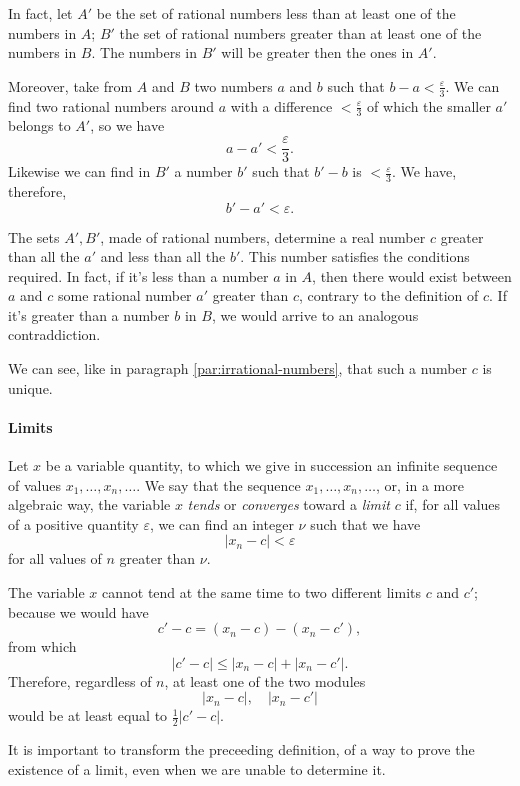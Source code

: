 \documentclass[10pt,letterpaper]{book}
\renewcommand\epsilon{\varepsilon}
\theoremstyle{definition}
\begin{document}
In fact, let $A'$ be the set of rational numbers
less than at least one of the numbers in $A$; $B'$ the set of rational numbers greater than at least one of the numbers in $B$. The numbers in $B'$ will be greater then the ones in $A'$.

Moreover, take from $A$ and $B$ two numbers $a$ and $b$ such that $b-a<\frac \epsilon 3$. We can find two rational numbers around $a$ with a difference $<\frac \epsilon 3$ of which the smaller $a'$ belongs to $A'$, so we have
\[
  a - a' < \frac \epsilon 3.
\]
Likewise we can find in $B'$ a number $b'$ such that $b'-b$ is $<\frac\epsilon 3$. We have, therefore,
\[
  b' - a' < \epsilon.
\]

The sets $A',B'$, made of rational numbers, determine a real number $c$ greater than all the $a'$ and less than all the $b'$. This number satisfies the conditions required. In fact, if it's less than a number $a$ in $A$, then there would exist between $a$ and $c$ some rational number $a'$ greater than $c$, contrary to the definition of $c$. If it's greater than a number $b$ in $B$, we would arrive to an analogous contraddiction.

We can see, like in paragraph \ref{par:irrational-numbers}, that such a number $c$ is unique.

\paragraph{Limits} Let $x$ be a variable quantity, to which we give in succession an infinite sequence of values $x_1,\dots,x_n,\dots$. We say that the sequence $x_1,\dots,x_n,\dots$, or, in a more algebraic way, the variable $x$ \textit{tends} or \textit{converges} toward a \textit{limit} $c$ if, for all values of a positive quantity $\epsilon$, we can find an integer $\nu$ such that we have
\[
  |x_n-c| < \epsilon
\]
for all values of $n$ greater than $\nu$.


The variable $x$ cannot tend at the same time to two different limits $c$ and $c'$; because we would have
\[
  c'-c = (x_n-c)-(x_n-c'),
\]
from which
\[
  |c' - c| \leq |x_n-c| + |x_n-c'|.
\]
Therefore, regardless of $n$, at least one of the two modules
\[
  |x_n-c|,\quad|x_n-c'|
\]
would be at least equal to $\frac 1 2 |c'-c|$.

It is important to transform the preceeding definition, of a way to prove the existence of a limit, even when we are unable to determine it.

\begin{thebibliography}{9}

\end{thebibliography}
\end{document}
